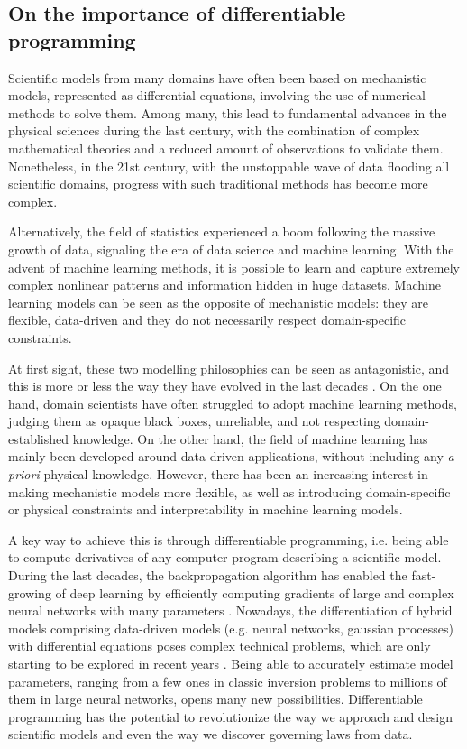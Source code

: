 \subsection{On the importance of differentiable programming}

Scientific models from many domains have often been based on mechanistic models, represented as differential equations, involving the use of numerical methods to solve them. 
Among many, this lead to fundamental advances in the physical sciences during the last century, with the combination of complex mathematical theories and a reduced amount of observations to validate them. 
Nonetheless, in the 21st century, with the unstoppable wave of data flooding all scientific domains, progress with such traditional methods has become more complex. 

Alternatively, the field of statistics experienced a boom following the massive growth of data, signaling the era of data science and machine learning.
With the advent of machine learning methods, it is possible to learn and capture extremely complex nonlinear patterns and information hidden in huge datasets. 
Machine learning models can be seen as the opposite of mechanistic models: they are flexible, data-driven and they do not necessarily respect domain-specific constraints.

At first sight, these two modelling philosophies can be seen as antagonistic, and this is more or less the way they have evolved in the last decades \cite{zdeborova_understanding_2020}. 
On the one hand, domain scientists have often struggled to adopt machine learning methods, judging them as opaque black boxes, unreliable, and not respecting domain-established knowledge. 
On the other hand, the field of machine learning has mainly been developed around data-driven applications, without including any \textit{a priori} physical knowledge. 
However, there has been an increasing interest in making mechanistic models more flexible, as well as introducing domain-specific or physical constraints and interpretability in machine learning models. 

A key way to achieve this is through differentiable programming, i.e. being able to compute derivatives of any computer program describing a scientific model.
During the last decades, the backpropagation algorithm has enabled the fast-growing of deep learning by efficiently computing gradients of large and complex neural networks with many parameters \cite{griewank2012invented}.
Nowadays, the differentiation of hybrid models comprising data-driven models (e.g. neural networks, gaussian processes) with differential equations poses complex technical problems, which are only starting to be explored in recent years \cite{ma_comparison_2021}. 
Being able to accurately estimate model parameters, ranging from a few ones in classic inversion problems to millions of them in large neural networks, opens many new possibilities. 
Differentiable programming has the potential to revolutionize the way we approach and design scientific models and even the way we discover governing laws from data. 

